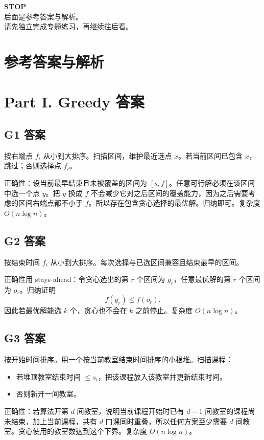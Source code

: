 \documentclass[UTF8,a4paper,11pt]{ctexart}
\begin{document}
\newpage
\thispagestyle{empty}
\begin{center}
{\Huge \textbf{STOP}}\\[2em]
{\Large 后面是参考答案与解析。}\\[1em]
{\Large 请先独立完成专题练习，再继续往后看。}
\end{center}

\newpage
\section*{参考答案与解析}

\section*{Part I. Greedy 答案}

\subsection*{G1 答案}

按右端点 $f_i$ 从小到大排序。扫描区间，维护最近选点 $x$。若当前区间已包含 $x$，跳过；否则选择点 $f_i$。

正确性：设当前最早结束且未被覆盖的区间为 $[s,f]$。任意可行解必须在该区间中选一个点 $y$。把 $y$ 换成 $f$ 不会减少它对之后区间的覆盖能力，因为之后需要考虑的区间右端点都不小于 $f$。所以存在包含贪心选择的最优解。归纳即可。复杂度 $O(n\log n)$。

\subsection*{G2 答案}

按结束时间 $f_i$ 从小到大排序。每次选择与已选区间兼容且结束最早的区间。

正确性用 stays-ahead：令贪心选出的第 $r$ 个区间为 $g_r$，任意最优解的第 $r$ 个区间为 $o_r$。归纳证明
\[
f(g_r)\le f(o_r).
\]
因此若最优解能选 $k$ 个，贪心也不会在 $k$ 之前停止。复杂度 $O(n\log n)$。

\subsection*{G3 答案}

按开始时间排序。用一个按当前教室结束时间排序的小根堆。扫描课程：
\begin{itemize}
  \item 若堆顶教室结束时间 $\le s_i$，把该课程放入该教室并更新结束时间。
  \item 否则新开一间教室。
\end{itemize}
正确性：若算法开第 $d$ 间教室，说明当前课程开始时已有 $d-1$ 间教室的课程尚未结束，加上当前课程，共有 $d$ 门课同时重叠，所以任何方案至少需要 $d$ 间教室。贪心使用的教室数达到这个下界。复杂度 $O(n\log n)$。
\end{document}
